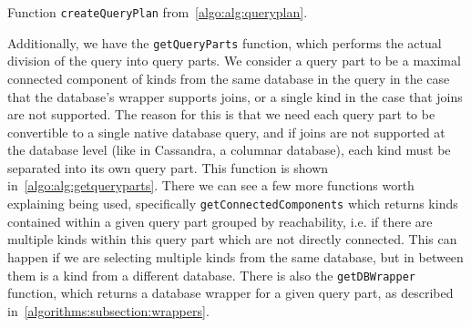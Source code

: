 \begin{algorithm}
\small
\DontPrintSemicolon
{}



\caption{Function \texttt{createQueryPlan} from~\cref{algo:alg:queryplan}.}
\label{algo:alg:createqueryplan}
\end{algorithm}

Additionally, we have the \texttt{getQueryParts} function, which performs the actual division of the query into query parts.
We consider a query part to be a maximal connected component of kinds from the same database in the query in the case that the database's wrapper supports joins, or a single kind in the case that joins are not supported.
The reason for this is that we need each query part to be convertible to a single native database query, and if joins are not supported at the database level (like in Cassandra, a columnar database), each kind must be separated into its own query part.
This function is shown in~\cref{algo:alg:getqueryparts}.
There we can see a few more functions worth explaining being used, specifically \texttt{getConnectedComponents} which returns kinds contained within a given query part grouped by reachability, i.e. if there are multiple kinds within this query part which are not directly connected.
This can happen if we are selecting multiple kinds from the same database, but in between them is a kind from a different database.
There is also the \texttt{getDBWrapper} function, which returns a database wrapper for a given query part, as described in~\cref{algorithms:subsection:wrappers}.

